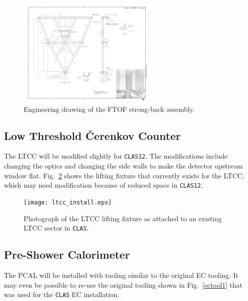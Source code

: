 \begin{figure}[htbp]
\centering
\includegraphics[width=0.6\textwidth]{ftof_strongback.eps}
\caption{\small{Engineering drawing of the FTOF strong-back assembly.}}
\label{tofstrongback}
\end{figure}

\subsection{Low Threshold {\v C}erenkov Counter}

The LTCC will be modified slightly for {\tt CLAS12}.  The modifications 
include changing the optics and changing the side walls to make the 
detector upstream window flat.  Fig.~\ref{cctool} shows the lifting
fixture that currently exists for the LTCC, which may need modification 
because of reduced space in {\tt CLAS12}.

\begin{figure}[htbp]
\centering
\texttt{[image: ltcc\_install.eps]}
\caption{\small{Photograph of the LTCC lifting fixture as attached to
an existing LTCC sector in {\tt CLAS}.}}
\label{cctool}
\end{figure}

\subsection{Pre-Shower Calorimeter}

The PCAL will be installed with tooling similar to the original EC 
tooling. It may even be possible to re-use the original tooling shown in
Fig.~\ref{ectool1} that was used for the {\tt CLAS} EC installation. 


